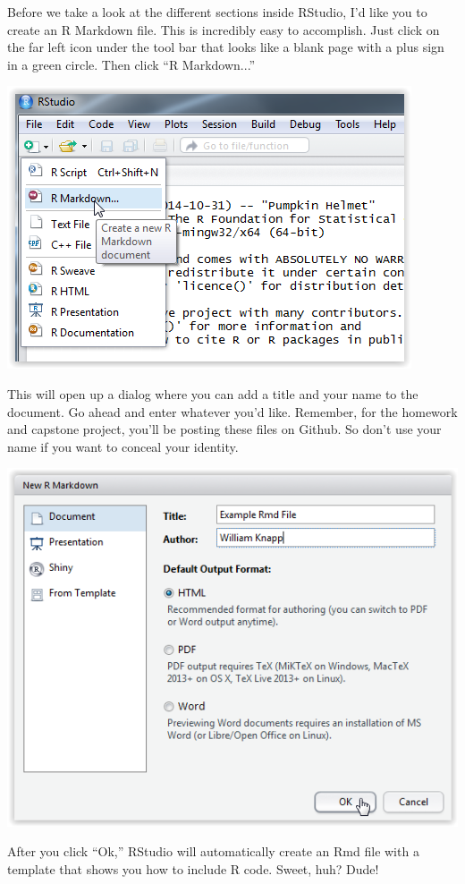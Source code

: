 \documentclass[12pt]{article}
\begin{document}
Before we take a look at the different sections inside RStudio, I'd like you
to create an R Markdown file. This is incredibly easy to accomplish. Just
click on the far left icon under the tool bar that looks like a blank page
with a plus sign in a green circle. Then click ``R Markdown...''

\includegraphics{imgs/R02.PNG}

This will open up a dialog where you can add a title and your name to the
document. Go ahead and enter whatever you'd like. Remember, for the homework
and capstone project, you'll be posting these files on Github. So don't use
your name if you want to conceal your identity.

\includegraphics{imgs/R03.PNG}

After you click ``Ok,'' RStudio will automatically create an Rmd file with
a template that shows you how to include R code. Sweet, huh? Dude!
\end{document}
